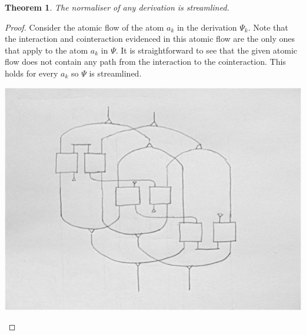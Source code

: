 \documentclass[a4paper]{amsart}
\newtheorem{thm}{Theorem}[section]
\theoremstyle{remark}
\theoremstyle{definition}
\begin{document}
\begin{thm}
The normaliser of any derivation is streamlined.
\end{thm}
\begin{proof}

Consider the atomic flow of the atom $a_k$ in the derivation $\Psi_k$. Note that the interaction and cointeraction evidenced in this atomic flow are the only ones that apply to the atom $a_k$ in $\Psi$. It is straightforward to see that the given atomic flow does not contain any path from the interaction to the cointeraction. This holds for every $a_k$ so $\Psi$ is streamlined.

\begin{center}
\includegraphics[scale=0.5]{./threeboxes.png}
\end{center}

\end{proof}



%
% 
% 
\end{document}
